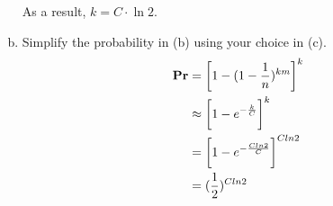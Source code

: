 \begin{problem}
\begin{enumerate}[(a)]
    As a result, $k = C \cdot \ln 2$.


    \item  Simplify the probability in (b) using your choice in (c).
    \Answer
    \begin{equation}
        \begin{aligned}
            \mathbf{Pr}&=\bigg[1-(1-\frac{1}{n})^{km}\bigg]^k \notag\\
            &\approx \bigg[1-e^{-\frac{k}{C}}\bigg]^k\\
            &=\bigg[1-e^{-\frac{Cln2}{C}}\bigg]^{Cln2}\\
            &=(\frac{1}{2})^{Cln2}
        \end{aligned}
    \end{equation}
\end{enumerate}
\end{problem}

